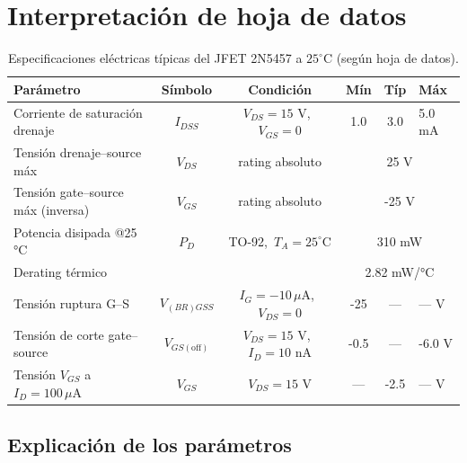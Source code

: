 \documentclass[chaptersright]{informeutn}
\begin{document}
\chapter{Interpretación de hoja de datos}

\begin{table}[h!]
\centering
\small
\begin{tabular}{l c c c c l}
\toprule
Parámetro & Símbolo & Condición & Mín & Típ & Máx \\
\midrule
Corriente de saturación drenaje & $I_{DSS}$ & $V_{DS}=15$ V,\ $V_{GS}=0$ & 1.0 & 3.0 & 5.0 mA \\
Tensión drenaje–source máx & $V_{DS}$ & rating absoluto & \multicolumn{3}{c}{25 V} \\
Tensión gate–source máx (inversa) & $V_{GS}$ & rating absoluto & \multicolumn{3}{c}{-25 V} \\
Potencia disipada @25 °C & $P_{D}$ & TO-92,\ $T_A=25^\circ$C & \multicolumn{3}{c}{310 mW} \\
Derating térmico &  &  & \multicolumn{3}{c}{2.82 mW/°C} \\
Tensión ruptura G–S & $V_{(BR)GSS}$ & $I_G=-10\,\mu$A,\ $V_{DS}=0$ & -25 & — & — V \\
Tensión de corte gate–source & $V_{GS(\text{off})}$ & $V_{DS}=15$ V,\ $I_D=10$ nA & -0.5 & — & -6.0 V \\
Tensión $V_{GS}$ a $I_D=100\,\mu$A & $V_{GS}$ & $V_{DS}=15$ V & — & -2.5 & — V \\
\bottomrule
\end{tabular}
\caption{Especificaciones eléctricas típicas del JFET 2N5457 a $25^\circ$C (según hoja de datos).}
\end{table}

\section*{Explicación de los parámetros}
\end{document}
